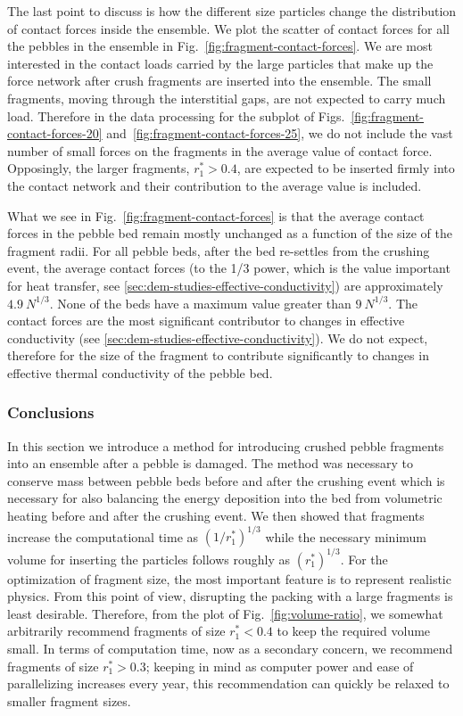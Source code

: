 \FloatBarrier

The last point to discuss is how the different size particles change the distribution of contact forces inside the ensemble. We plot the scatter of contact forces for all the pebbles in the ensemble in Fig.~\ref{fig:fragment-contact-forces}. We are most interested in the contact loads carried by the large particles that make up the force network after crush fragments are inserted into the ensemble. The small fragments, moving through the interstitial gaps, are not expected to carry much load. Therefore in the data processing for the subplot of Figs.~\ref{fig:fragment-contact-forces-20} and~\ref{fig:fragment-contact-forces-25}, we do not include the vast number of small forces on the fragments in the average value of contact force. Opposingly, the larger fragments, $r_1^*>0.4$, are expected to be inserted firmly into the contact network and their contribution to the average value is included.

What we see in Fig.~\ref{fig:fragment-contact-forces} is that the average contact forces in the pebble bed remain mostly unchanged as a function of the size of the fragment radii. For all pebble beds, after the bed re-settles from the crushing event, the average contact forces (to the 1/3 power, which is the value important for heat transfer, see \cref{sec:dem-studies-effective-conductivity}) are approximately $4.9\ N^{1/3}$. None of the beds have a maximum value greater than $9\ N^{1/3}$. The contact forces are the most significant contributor to changes in effective conductivity (see \cref{sec:dem-studies-effective-conductivity}). We do not expect, therefore for the size of the fragment to contribute significantly to changes in effective thermal conductivity of the pebble bed.

\subsubsection{Conclusions}

In this section we introduce a method for introducing crushed pebble fragments into an ensemble after a pebble is damaged. The method was necessary to conserve mass between pebble beds before and after the crushing event which is necessary for also balancing the energy deposition into the bed from volumetric heating before and after the crushing event. We then showed that fragments increase the computational time as $(1/r_1^*)^{1/3}$ while the necessary minimum volume for inserting the particles follows roughly as $(r_1^*)^{1/3}$. For the optimization of fragment size, the most important feature is to represent realistic physics. From this point of view, disrupting the packing with a large fragments is least desirable. Therefore, from the plot of Fig.~\ref{fig:volume-ratio}, we somewhat arbitrarily recommend fragments of size $r_1^* < 0.4$ to keep the required volume small. In terms of computation time, now as a secondary concern, we recommend fragments of size $r_1^* > 0.3$; keeping in mind as computer power and ease of parallelizing increases every year, this recommendation can quickly be relaxed to smaller fragment sizes.

